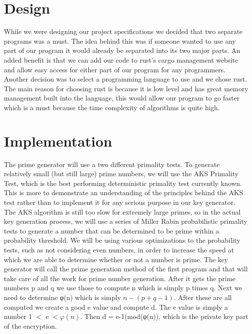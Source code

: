 \documentclass[12pt,journal,compsoc]{IEEEtran}
\begin{document}
\section{Design}
\indent While we were designing our project specifications we decided that two separate programs was a must. The idea behind this was if someone wanted to use any part of our program it would already be separated into its two major parts. An added benefit is that we can add our code to rust's cargo management website and allow easy access for either part of our program for any programmers. 
\newline
\indent Another decision was to select a programming language to use and we chose rust. The main reason for choosing rust is because it is low level and has great memory management built into the language, this would allow our program to go faster which is a must because the time complexity of algorithms is quite high.
\newline \indent


\section{Implementation}
The prime generator will use a two different primality tests. To generate relatively small (but still large) prime numbers, we will use the AKS Primality Test, which is the best performing deterministic primality test currently known. This is more to demonstrate an understanding of the principles behind the AKS test rather than to implement it for any serious purpose in our key generator. The AKS algorithm is still too slow for extremely large primes, so in the actual key generation process, we will use a series of Miller Rabin probabilistic primality tests to generate a number that can be determined to be prime within a probability threshold. We will be using various optimizations to the probability tests, such as not considering even numbers, in order to increase the speed at which we are able to determine whether or not a number is prime.  
\newline \indent The key generator will call the prime generation method of the first program and that will take care of all the work for prime number generation. After it gets the prime numbers p and q we use those to compute n which is simply p times q. Next we need to determine φ(n) which is simply $n - (p + q -1)$. After these are all computed we create a good e value and compute d. The e value is simply a number 1 $<$ e $<φ(n)$. Then d = e-1(mod(φ(n)), which is the private key part of the encryption.
\end{document}
